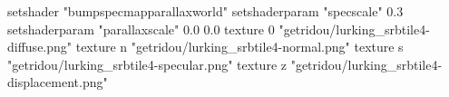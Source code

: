 setshader "bumpspecmapparallaxworld"
setshaderparam "specscale" 0.3
setshaderparam "parallaxscale" 0.0 0.0
texture 0 "getridou/lurking_srbtile4-diffuse.png"
texture n "getridou/lurking_srbtile4-normal.png"
texture s "getridou/lurking_srbtile4-specular.png"
texture z "getridou/lurking_srbtile4-displacement.png"